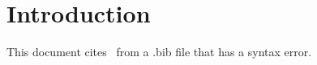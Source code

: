 \documentclass{article}
\begin{document}
\section{Introduction}

This document cites~\cite{jones2024} from a .bib file that has a syntax error.



\end{document}
